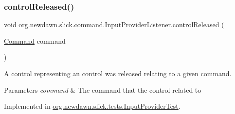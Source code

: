 \subsubsection{\texorpdfstring{control\+Released()}{controlReleased()}}
{\footnotesize\ttfamily void org.\+newdawn.\+slick.\+command.\+Input\+Provider\+Listener.\+control\+Released (\begin{DoxyParamCaption}\item[{\mbox{\hyperlink{interfaceorg_1_1newdawn_1_1slick_1_1command_1_1_command}{Command}}}]{command }\end{DoxyParamCaption})}

A control representing an control was released relating to a given command.


\begin{DoxyParams}{Parameters}
{\em command} & The command that the control related to \\
\hline
\end{DoxyParams}


Implemented in \mbox{\hyperlink{classorg_1_1newdawn_1_1slick_1_1tests_1_1_input_provider_test_a68bf86e0de9df06f1a129faa2337a662}{org.\+newdawn.\+slick.\+tests.\+Input\+Provider\+Test}}.

